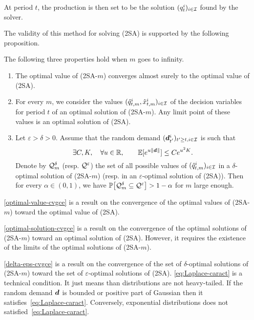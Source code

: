 At period $t$, the production is then set to be the solution $(q_t^i)_{i\in\mathcal{I}}$ found by the solver.


The validity of this method for solving (2SA) is supported by the following proposition.


\begin{prop}
\label{prop:cvgce-2SAm}
The following three properties hold when $m$ goes to infinity.
\begin{enumerate}[label=\textup{(\roman*)}]
\item \label{optimal-value-cvgce} The optimal value of \textup{(2SA-$m$)} converges almost surely to the optimal value of \textup{(2SA)}.

\item \label{optimal-solution-cvgce} For every $m$, we consider the values $(\hat{q}_{t,m}^i,\hat{x}_{t,m}^i)_{i\in\mathcal{I}}$ of the decision variables for period $t$ of an optimal solution of \textup{(2SA-$m$)}.
Any limit point of these values is an optimal solution of \textup{(2SA)}.

\item \label{delta-eps-cvgce} Let $\varepsilon> \delta > 0$.
Assume that the random demand $(\va\demand_{t'}^i)_{t'\geq t, i\in\REF}$ is such that
\begin{equation}
\exists C,K, \quad \forall u \in \RR, \qquad \EE[e^{u \|\va d\|}] \leq C e^{u^2 K} .
\label{eq:Laplace-caract}
\end{equation}
Denote by $\mathcal{Q}_m^{\delta}$ (resp. $\mathcal{Q}^{\varepsilon}$) the set of all possible values of $(\hat {q}_{t,m}^i)_{i\in\mathcal{I}}$ in a $\delta$-optimal solution of \textup{(2SA-$m$)} (resp. in an $\varepsilon$-optimal solution of \textup{(2SA)}).
Then for every $\alpha \in (0,1)$, we have $ \PP\sqbracket{\cQ_m^{\delta}\subseteq\cQ^{\varepsilon}} > 1 - \alpha$ for $m$ large enough.
\end{enumerate}
\end{prop}


\cref{optimal-value-cvgce} is a result on the convergence of the optimal values of (2SA-$m$) toward the optimal value of (2SA).


\cref{optimal-solution-cvgce} is a result on the convergence of the optimal solutions of (2SA-$m$) toward an optimal solution of (2SA).
However, it requires the existence of the limits of the optimal solutions of (2SA-$m$).


\cref{delta-eps-cvgce} is a result on the convergence of the set of $\delta$-optimal solutions of (2SA-$m$) toward the set of $\varepsilon$-optimal solutions of (2SA).
\cref{eq:Laplace-caract} is a technical condition.
It just means than distributions are not heavy-tailed.
If the random demand $\va\demand$ is bounded or positive part of Gaussian then it satisfies~\eqref{eq:Laplace-caract}.
Conversely, exponential distributions does not satisfied~\eqref{eq:Laplace-caract}.



